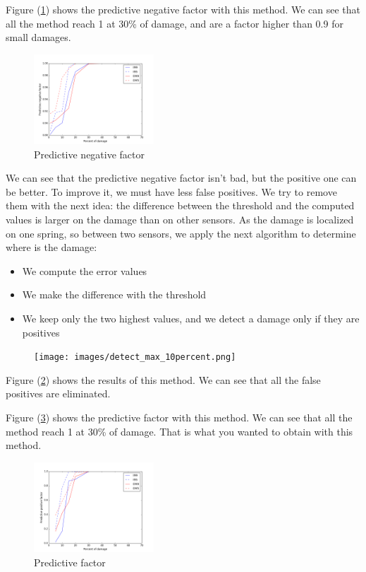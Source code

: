 \documentclass[journal]{IEEEtran}
\begin{document}
Figure (\ref{pred_neg}) shows the predictive negative factor with this method. We can see that all the method reach 1 at 30\% of damage, and are a factor higher than 0.9 for small damages.
\begin{figure}[h!]
  \centering
  \includegraphics[width=0.4\textwidth]{images/pred_neg.png}
  \caption{Predictive negative factor}
  \label{pred_neg}
\end{figure}

We can see that the predictive negative factor isn't bad, but the positive one can be better. To improve it, we must have less false positives. We try to remove them with the next idea: the difference between the threshold and the computed values is larger on the damage than on other sensors. As the damage is localized on one spring, so between two sensors, we apply the next algorithm to determine where is the damage:
\begin{itemize}
\item We compute the error values
\item We make the difference with the threshold
\item We keep only the two highest values, and we detect a damage only if they are positives
\end{itemize}

\begin{figure}[h!]
  \centering
  \texttt{[image: images/detect\_max\_10percent.png]}
  \caption{}
  \label{detect_max}
\end{figure}

Figure (\ref{detect_max}) shows the results of this method. We can see that all the false positives are eliminated.


Figure (\ref{pred_max}) shows the predictive factor with this method. We can see that all the method reach 1 at 30\% of damage. That is what you wanted to obtain with this method.

\begin{figure}[h!]
  \centering
  \includegraphics[width=0.4\textwidth]{images/pred_max.png}
  \caption{Predictive factor}
  \label{pred_max}
\end{figure}
\end{document}
